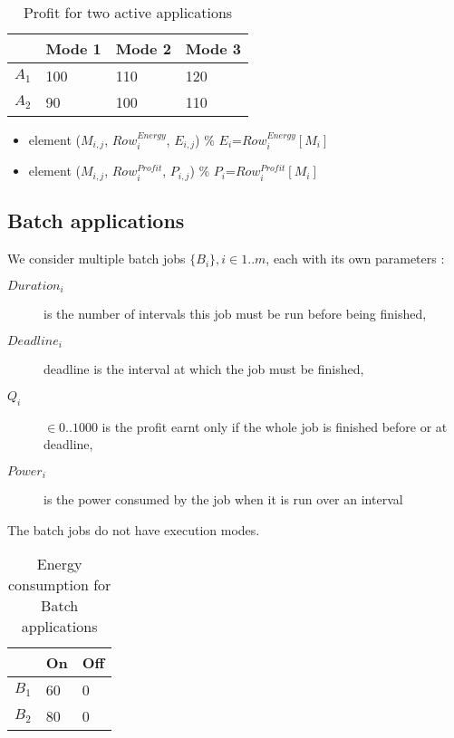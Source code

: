 \documentclass[a4paper]{article}
\begin{document}
\begin{table}[H]
\begin{center}
    \begin{tabular}{ | l | l | l | l |}
    \hline
      & Mode 1 & Mode 2 & Mode 3 \\ \hline
    $A_1$ & 100 & 110 & 120 \\ \hline
    $A_2$ & 90 & 100 & 110 \\
    \hline
    \end{tabular}
\end{center}
\caption{Profit for two active applications}
\end{table}

\begin{itemize}
 \item element ($M_{i,j}$, $Row^{Energy}_{i}$, $E_{i,j}$) \% \quad $E_i$=$Row^{Energy}_{i} [M_i]$
 \item element ($M_{i,j}$, $Row^{Profit}_{i}$, $P_{i,j}$) \% \quad $P_i$=$Row^{Profit}_{i} [M_i]$
\end{itemize}

\subsection{Batch applications}

We consider multiple batch jobs $\{B_{i}\}, i \in1..m$, each with its own parameters :

\begin{description}
\item [$Duration_i$] is the number of intervals this job must be run before being finished,
\item [$Deadline_i$] deadline is the interval at which the job must be finished,
\item [$Q_i$] $\in 0..1000$ is the profit earnt only if the whole job is finished before or at deadline,
\item [$Power_i$] is the power consumed by the job when it is run over an interval
\end{description}
The batch jobs do not have execution modes.

\begin{table}[H]
\begin{center}
  \begin{tabular}{ | l | l | l | }
     \hline
      & On & Off \\ \hline
    $B_1$ & 60 & 0 \\ \hline
    $B_2$ & 80 & 0 \\
    \hline
    \end{tabular}
\end{center}
\caption{Energy consumption for Batch applications}
\end{table}
\end{document}
